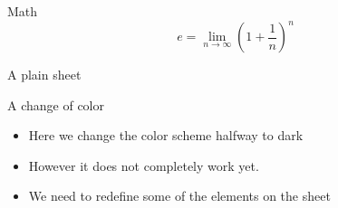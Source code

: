 \documentclass[12pt]{beamer}
\begin{document}
\begin{frame}{Math}
  \begin{equation*}
    e = \lim_{n\to \infty} \left(1 + \frac{1}{n}\right)^n
  \end{equation*}
\end{frame}

\begin{frame}[plain]
  A plain sheet
\end{frame}
 
\begin{frame}{A change of color}
\begin{itemize}
  \item Here we change the color scheme halfway to dark
    \item However it does not completely work yet.
    \item We need to redefine some of the elements on the sheet
\end{itemize}   
\end{frame}
\end{document}
